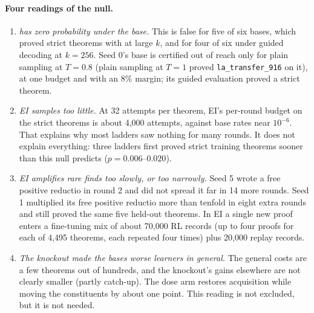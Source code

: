 \paragraph{Four readings of the null.}
\begin{enumerate}
\item \emph{\sig{} has zero probability under the base.} This is false for five of six bases, which proved strict theorems with
\sig{} at large $k$, and for four of six under guided decoding at $k = 256$. Seed 0's base is certified out of reach only
for plain sampling \rv{} at $T = 0.8$ (plain sampling at $T = 1$ proved \texttt{la\_transfer\_916} on it), at one budget
and with an 8\% margin; its guided evaluation proved a strict theorem.
\item \emph{EI samples too little.} At 32 attempts per theorem, EI's per-round budget on the strict theorems is about
4,000 attempts, against base rates near $10^{-6}$. That explains why most ladders saw nothing for many rounds. It does
not explain everything: three ladders first proved strict training theorems sooner than this null predicts \rv{} ($p = 0.006$--$0.020$).
\item \emph{EI amplifies rare finds too slowly, or too narrowly.} Seed 5 wrote a free positive reductio in round 2 and did
not spread it far in 14 more rounds. Seed 1 multiplied its free positive reductio more than tenfold in eight extra rounds and still
proved the same five held-out theorems. In EI a single new proof enters a fine-tuning mix of about 70,000 RL records (up
to four proofs for each of 4,495 theorems, each repeated four times) plus 20,000 replay records.
\item \emph{The knockout made the bases worse learners in general.} The general costs are a few theorems out of
hundreds, and the knockout's gains elsewhere are not clearly smaller (partly catch-up). The dose arm restores
acquisition while moving the constituents by about one point. This reading is not excluded, but it is not needed.
\end{enumerate}

